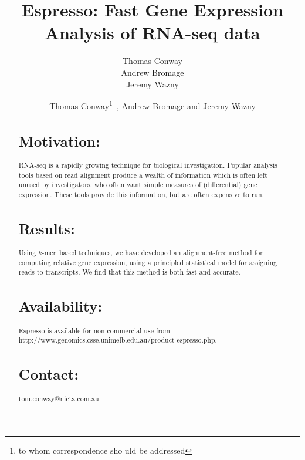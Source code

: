 \documentclass{bioinfo}
\newcommand{\Espresso}{Espresso}
\newcommand{\kmer}{$k$-mer{}}
\begin{document}

\author{
Thomas Conway \\
Andrew Bromage \\
Jeremy Wazny
}

\title[\Espresso{}]{Espresso: Fast Gene Expression Analysis of RNA-seq data}
\author[Conway \textit{et~al}]{Thomas Conway\footnote{to whom correspondence sho
uld be addressed}\ , Andrew Bromage and Jeremy Wazny}
\address{NICTA Victoria Research Laboratory, Department of Computer Science and 
Software Engineering, The University of Melbourne, Parkville, Australia\\
}



\maketitle

\begin{abstract}

\section{Motivation:}
RNA-seq is a rapidly growing technique for biological investigation.
Popular analysis tools based on read alignment produce a wealth of
information which is often left unused by investigators, who often
want simple measures of (differential) gene expression. These tools
provide this information, but are often expensive to run.

\section{Results:}
Using \kmer\ based techniques, we have developed an alignment-free
method for computing relative gene expression, using a principled
statistical model for assigning reads to transcripts.
We find that this method is both fast and accurate.

\section{Availability:}
\Espresso{} is available for non-commercial use 
from http://www.genomics.csse.unimelb.edu.au/product-espresso.php.

\section{Contact:} \href{tom.conway@nicta.com.au}{tom.conway@nicta.com.au}
\end{abstract}
\end{document}
